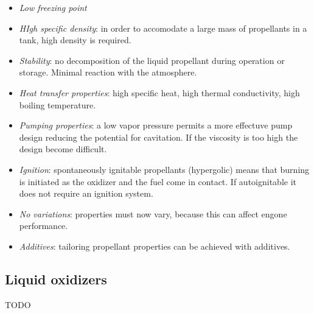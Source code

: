 \documentclass[12pt]{article}
\begin{document}
\begin{itemize}
    \item \textit{Low freezing point}
    \item \textit{HIgh specific density}: in order to accomodate a large mass of propellants in a tank, high density is required.
    \item \textit{Stability}: no decomposition of the liquid propellant during operation or storage. Minimal reaction with the atmosphere.
    \item \textit{Heat transfer properties}: high specific heat, high thermal conductivity, high boiling temperature.
    \item \textit{Pumping properties}: a low vapor pressure permits a more effectuve pump design reducing the potential for cavitation. If the viscosity is too high the design become difficult.
    \item \textit{Ignition}: spontaneously ignitable propellants (hypergolic) means that burning is initiated as the oxidizer and the fuel come in contact. If autoignitable it does not require an ignition system.
    \item \textit{No variations}: properties must now vary, because this can affect engone performance.
    \item \textit{Additives}: tailoring propellant properties can be achieved with additives.
\end{itemize}

\subsection{Liquid oxidizers}

TODO










\newpage
\end{document}
